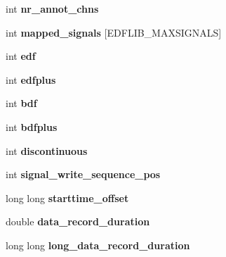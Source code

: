 \begin{DoxyCompactItemize}
\item 
\hypertarget{structedfhdrblock_aebc6eb1cb3d1904c824c8cd4d906f55e}{}int {\bfseries nr\+\_\+annot\+\_\+chns}\label{structedfhdrblock_aebc6eb1cb3d1904c824c8cd4d906f55e}

\item 
\hypertarget{structedfhdrblock_a7d7c87c520eb64bcdeaf4942d211d657}{}int {\bfseries mapped\+\_\+signals} \mbox{[}E\+D\+F\+L\+I\+B\+\_\+\+M\+A\+X\+S\+I\+G\+N\+A\+L\+S\mbox{]}\label{structedfhdrblock_a7d7c87c520eb64bcdeaf4942d211d657}

\item 
\hypertarget{structedfhdrblock_a891b18d0f82dd4d914c587ad974cb6d7}{}int {\bfseries edf}\label{structedfhdrblock_a891b18d0f82dd4d914c587ad974cb6d7}

\item 
\hypertarget{structedfhdrblock_acd82e06a4402ab6015371fc929dcd9c6}{}int {\bfseries edfplus}\label{structedfhdrblock_acd82e06a4402ab6015371fc929dcd9c6}

\item 
\hypertarget{structedfhdrblock_a774203f29d98b35ed5c51eeb30613869}{}int {\bfseries bdf}\label{structedfhdrblock_a774203f29d98b35ed5c51eeb30613869}

\item 
\hypertarget{structedfhdrblock_a546f9b0e84ed2d6881ae2d2b4556c55d}{}int {\bfseries bdfplus}\label{structedfhdrblock_a546f9b0e84ed2d6881ae2d2b4556c55d}

\item 
\hypertarget{structedfhdrblock_a508be579a3d335f8b8a972259dfb1317}{}int {\bfseries discontinuous}\label{structedfhdrblock_a508be579a3d335f8b8a972259dfb1317}

\item 
\hypertarget{structedfhdrblock_a03b6c03a7d9f39909ed5f42c34f0aa46}{}int {\bfseries signal\+\_\+write\+\_\+sequence\+\_\+pos}\label{structedfhdrblock_a03b6c03a7d9f39909ed5f42c34f0aa46}

\item 
\hypertarget{structedfhdrblock_a9f8fb10266dd4f73d8ae103ce96bbf6b}{}long long {\bfseries starttime\+\_\+offset}\label{structedfhdrblock_a9f8fb10266dd4f73d8ae103ce96bbf6b}

\item 
\hypertarget{structedfhdrblock_aaecefdd7e99ebe600f7216de45ee6103}{}double {\bfseries data\+\_\+record\+\_\+duration}\label{structedfhdrblock_aaecefdd7e99ebe600f7216de45ee6103}

\item 
\hypertarget{structedfhdrblock_a6f1e87a63541034223e9a74f10109cc2}{}long long {\bfseries long\+\_\+data\+\_\+record\+\_\+duration}\label{structedfhdrblock_a6f1e87a63541034223e9a74f10109cc2}


\end{DoxyCompactItemize}
